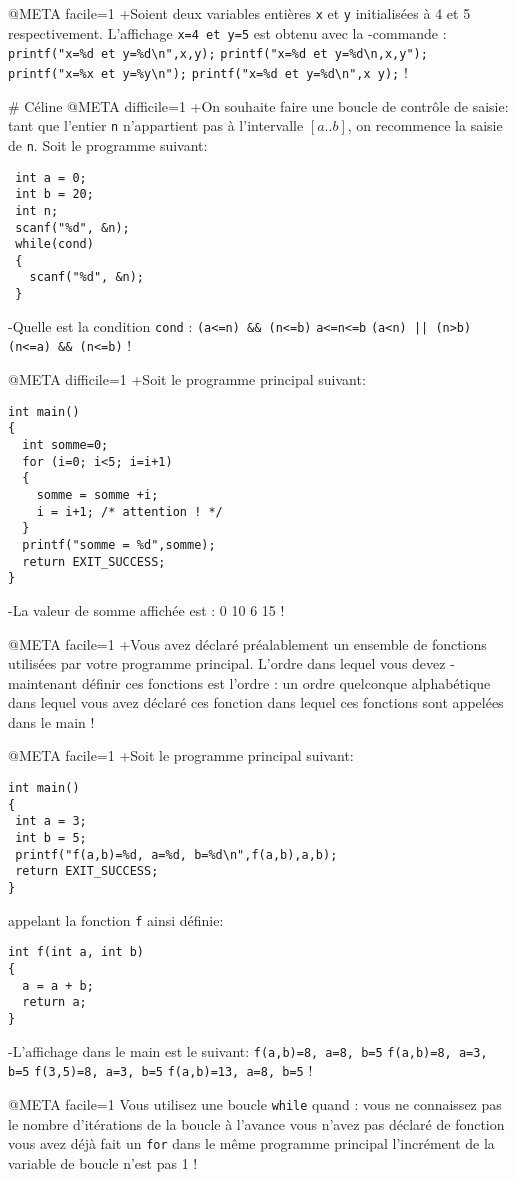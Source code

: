 @META facile=1
+Soient deux variables entières \verb|x| et \verb|y| initialisées à
4 et 5 respectivement. L'affichage \verb|x=4 et y=5| est obtenu avec la
-commande :
 \verb|printf("x=%d et y=%d\n",x,y);|
 \verb|printf("x=%d et y=%d\n,x,y");|
 \verb|printf("x=%x et y=%y\n");|
 \verb|printf("x=%d et y=%d\n",x y);|
!

# Céline
@META difficile=1
+On souhaite faire une boucle de contrôle de saisie: tant que l'entier
\verb|n| n'appartient pas à l'intervalle $[a..b]$, on recommence la
saisie de \verb|n|. Soit le programme suivant:
 \begin{verbatim}
 int a = 0; 
 int b = 20;
 int n;
 scanf("%d", &n); 
 while(cond) 
 {
   scanf("%d", &n);
 }
\end{verbatim}
-Quelle est la condition \verb|cond| : 
 \verb|(a<=n) && (n<=b)|
 \verb|a<=n<=b|
 \verb+(a<n) || (n>b)+
 \verb|(n<=a) && (n<=b)| 
!

@META difficile=1
+Soit le programme principal suivant: 
 \begin{verbatim}
int main() 
{
  int somme=0;
  for (i=0; i<5; i=i+1) 
  {
    somme = somme +i;
    i = i+1; /* attention ! */
  }
  printf("somme = %d",somme); 
  return EXIT_SUCCESS;
}
\end{verbatim}
-La valeur de somme affichée est : 
 0
 10
 6
 15
!

@META facile=1
+Vous avez déclaré préalablement un ensemble de fonctions utilisées
par votre programme principal. L'ordre dans lequel vous devez
-maintenant définir ces fonctions est l'ordre : 
 un ordre quelconque
 alphabétique 
 dans lequel vous avez déclaré ces fonction
 dans lequel ces fonctions sont appelées dans le main
!

@META facile=1
+Soit le programme principal suivant: 
 \begin{verbatim}
int main() 
{
 int a = 3;
 int b = 5;
 printf("f(a,b)=%d, a=%d, b=%d\n",f(a,b),a,b);
 return EXIT_SUCCESS;
}
\end{verbatim}
 appelant la fonction \verb|f| ainsi définie: 
 \begin{verbatim}
int f(int a, int b)
{
  a = a + b; 
  return a;
}
\end{verbatim}
-L'affichage dans le main est le suivant: 
 \verb|f(a,b)=8, a=8, b=5|
 \verb|f(a,b)=8, a=3, b=5|
 \verb|f(3,5)=8, a=3, b=5|
 \verb|f(a,b)=13, a=8, b=5|
!

@META facile=1
Vous utilisez une boucle \verb|while| quand :
 vous ne connaissez pas le nombre d'itérations de la boucle à l'avance
 vous n'avez pas déclaré de fonction
 vous avez déjà fait un  \verb|for| dans le même programme principal 
 l'incrément de la variable de boucle n'est pas 1
!

